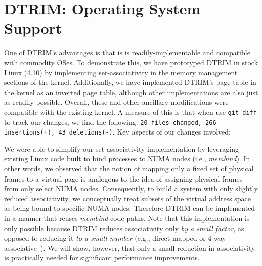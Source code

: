\section{DTRIM: Operating System Support}
\label{sec:os}

One of DTRIM's advantages is that is is readily-implement\-able and
compatible with commodity OSes. To demonstrate this, we have
prototyped DTRIM in stock Linux (4.10) by implementing
set-associativity in the memory management sections of the
kernel. Additionally, we have implemented DTRIM's page table in the
kernel as an inverted page table, although other implementations are
also just as readily possible.  Overall, these and other ancillary
modifications were compatible with the existing kernel. A measure of
this is that when use \verb|git diff| to track our changes, we find
the following: \texttt{20 files changed, 266 insertions(+), 43
  deletions(-)}. Key aspects of our changes involved:

\vspace{2mm}
 We were
able to simplify our set-associativity implementation by leveraging
existing Linux code built to bind processes to NUMA nodes (i.e., {\it
  membind}). In other words, we observed that the notion of mapping
only a fixed set of physical frames to a virtual page is analogous to
the idea of assigning physical frames from only select NUMA
nodes. Consequently, to build a system with only slightly reduced
associativity, we conceptually treat subsets of the virtual address
space as being bound to specific NUMA nodes. Therefore DTRIM can be
implemented in a manner that reuses {\it membind} code paths. Note
that this implementation is only possible because DTRIM reduces
associativity only \textit{by a small factor}, as opposed to reducing
it \textit{to a small number} (e.g., direct mapped or 4-way
associative~\cite{picorel:near-memory}). We will show, however, that
only a small reduction in associativity is practically needed for
significant performance improvements.


